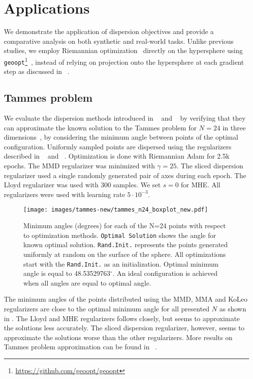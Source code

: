 \documentclass[10pt]{article} %
\begin{document}
\section{Applications}
We demonstrate the application of dispersion objectives and provide a comparative analysis on both synthetic and real-world tasks. Unlike previous studies, we employ Riemannian optimization~\citep{bonnabel2013stochastic, becigneul2018riemannian} directly on the hypersphere using \texttt{geoopt}\footnote{\url{https://github.com/geoopt/geoopt}}~\citep{geoopt2020kochurov}, instead of relying on projection onto the hypersphere at each gradient step as discussed in ~. 
\subsection{Tammes problem}
\label{applications:Tammes}
We evaluate the dispersion methods introduced in ~ and ~ by verifying that they can approximate the known solution to the Tammes problem for $N=24$ in three dimensions~\citep{ROBINSON1961}, by considering the minimum angle between points of the optimal configuration.
Uniformly sampled points are dispersed using the regularizers described in ~ and ~. Optimization is done with Riemannian Adam for 2.5k epochs. The MMD regularizer was minimized with \(\gamma = 25\). The sliced dispersion regularizer used a single randomly generated pair of axes during each epoch. The Lloyd regularizer was used with 300 samples. We set $s=0$ for MHE. All regularizers were used with learning rate \(5 \cdot 10^{-3}\).
\begin{figure}[t]
    \centering
        \centering
        \texttt{[image: images/tammes-new/tammes\_n24\_boxplot\_new.pdf]}
    \caption{Minimum angles (degrees) for each of the N=24 points with respect to optimization methods. \texttt{Optimal Solution} shows the angle for known optimal solution. \texttt{Rand.Init.} represents the points generated uniformly at random on the surface of the sphere. All optimizations start with the \texttt{Rand.Init.} as an initialization. Optimal minimum angle is equal to 48.53529763$^{\circ}$. An ideal configuration is achieved when all angles are equal to optimal angle.}
    \label{fig:tammes-131424}
\end{figure}

The minimum angles of the points distributed using the MMD, MMA and KoLeo regularizers are close to the optimal minimum angle for all presented $N$ as shown in . The Lloyd and MHE regularizers follows closely, but seems to approximate the solutions less accurately. 
The sliced dispersion regularizer, however, seems to approximate the solutions worse than the other regularizers. More results on Tammes problem approximation can be found in ~.
\end{document}
